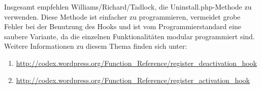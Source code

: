 Insgesamt empfehlen Williams/Richard/Tadlock, die Uninstall.php-Methode zu verwenden. Diese Methode ist einfacher zu programmieren, vermeidet grobe Fehler bei der Benutzung des Hooks und ist vom Programmierstandard eine saubere Variante, da die einzelnen Funktionalitäten modular programmiert sind.\newline
Weitere Informationen zu diesem Thema finden sich unter:\begin{enumerate}
\item \url{http://codex.wordpress.org/Function\_Reference/register\_deactivation\_hook}
\item \url{http://codex.wordpress.org/Function\_Reference/register\_activation\_hook}
\end{enumerate}